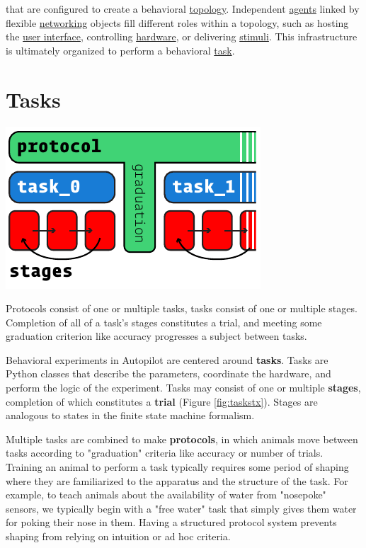  that are configured to create a behavioral \hyperref[sec:topology]{topology}. Independent \hyperref[sec:agents]{agents} linked by flexible \hyperref[sec:networking]{networking} objects fill different roles within a topology, such as hosting the \hyperref[sec:ui]{user interface}, controlling \hyperref[sec:hardware]{hardware}, or delivering \hyperref[sec:stim]{stimuli}. This infrastructure is ultimately organized to perform a behavioral \hyperref[sec:tasks]{task}.

\section{Tasks}
\label{sec:tasks}
\begin{marginfigure}[5.9cm]
\includegraphics[]{figures/side_17_protocol.pdf}
\caption{Protocols consist of one or multiple tasks, tasks consist of one or multiple stages. Completion of all of a task's stages constitutes a trial, and meeting some graduation criterion like accuracy progresses a subject between tasks.}
\label{fig:taskstx}
\end{marginfigure}

Behavioral experiments in Autopilot are centered around \textbf{tasks}. Tasks are Python classes that describe the parameters, coordinate the hardware, and perform the logic of the experiment. Tasks may consist of one or multiple \textbf{stages}, completion of which constitutes a \textbf{trial} (Figure \ref{fig:taskstx}). Stages are analogous to states in the finite state machine formalism. 

Multiple tasks are combined to make \textbf{protocols}, in which animals move between tasks according to "graduation" criteria like accuracy or number of trials. Training an animal to perform a task typically requires some period of shaping where they are familiarized to the apparatus and the structure of the task. For example, to teach animals about the availability of water from "nosepoke" sensors, we typically begin with a "free water" task that simply gives them water for poking their nose in them. Having a structured protocol system prevents shaping from relying on intuition or ad hoc criteria.

